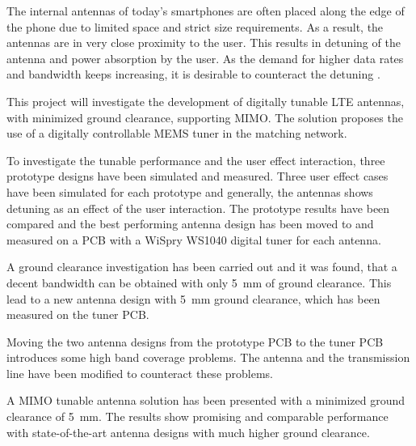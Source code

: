 \noindent
The internal antennas of today's smartphones are often placed along the edge of the phone due to limited space and strict size requirements. As a result, the antennas are in very close proximity to the user. This results in detuning of the antenna and power absorption by the user. As the demand for higher data rates and bandwidth keeps increasing, it is desirable to counteract the detuning \cite{hilbert2015tradeoff}.    

\vspace{0.5em}
\noindent
This project will investigate the development of digitally tunable LTE antennas, with minimized ground clearance, supporting MIMO.
The solution proposes the use of a digitally controllable MEMS tuner in the matching network.


\vspace{0.5em}
\noindent
To investigate the tunable performance and the user effect interaction, three prototype designs have been simulated and measured. Three user effect cases have been simulated for each prototype and generally, the antennas shows detuning as an effect of the user interaction. 
The prototype results have been compared and the best performing antenna design has been moved to and measured on a PCB with a WiSpry WS1040 digital tuner for each antenna.

\vspace{0.5em}
\noindent
A ground clearance investigation has been carried out and it was found, that a decent bandwidth can be obtained with only \SI{5}{mm} of ground clearance. This lead to a new antenna design with \SI{5}{mm} ground clearance, which has been measured on the tuner PCB.

\vspace{0.5em}
\noindent
Moving the two antenna designs from the prototype PCB to the tuner PCB introduces some high band coverage problems. The antenna and the transmission line have been modified to counteract these problems.  

\vspace{0.5em}
\noindent
A MIMO tunable antenna solution has been presented with a minimized ground clearance of \SI{5}{mm}. The results show promising and comparable performance with state-of-the-art antenna designs with much higher ground clearance.
